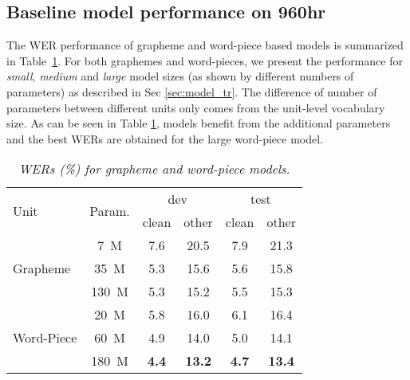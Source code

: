 \documentclass[a4paper]{article}
\begin{document}
\subsection{Baseline model performance on 960hr}
\vspace{-1mm}
The WER performance of grapheme and word-piece based models is summarized in
Table~\ref{baseline960}.
For both graphemes and word-pieces, we present the performance for \textit{small}, \textit{medium} and \textit{large}
model sizes (as shown by different numbers of parameters) as described in Sec \ref{sec:model_tr}. The difference of number of parameters between different units only comes from the unit-level vocabulary size.
As can be seen in Table \ref{baseline960}, models benefit from the additional parameters and the best
WERs are obtained for the large word-piece model.
\vspace{-2mm}
	\begin{table}[h]
		\centering
\caption{\it WERs (\%) for grapheme and word-piece models.}
\vspace{-2mm}
		\label{baseline960}
		\begin{tabular}{ |l|c|c|c|c|c|} \hline
			\multirow{2}{*}{Unit}      & \multirow{2}{*}{Param.}  & \multicolumn{2}{|c|}{dev} & \multicolumn{2}{|c|}{test}    \\ \cline{3-6}
			&   & clean & other & clean & other    \\ \hline
			\multirow{3}{*}{Grapheme}   & 7~M    & 7.6 & 20.5 & 7.9 & 21.3  \\
			& 35~M   & 5.3 & 15.6 & 5.6 & 15.8  \\
			& 130~M  & 5.3 & 15.2 & 5.5 & 15.3  \\ \hline
			\multirow{3}{*}{Word-Piece} & 20~M   & 5.8 & 16.0 & 6.1 & 16.4 \\
			& 60~M   & 4.9 & 14.0 & 5.0 & 14.1 \\
			& 180~M  & \textbf{4.4} & \textbf{13.2} & \textbf{4.7} & \textbf{13.4} \\ \hline
		\end{tabular}
\end{table}
\end{document}
